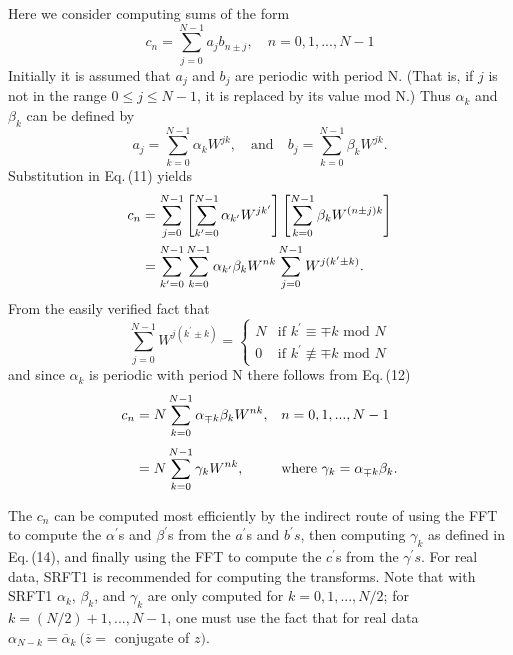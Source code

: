 \documentclass[twoside]{MATH77}
\begin{document}
Here we consider computing sums of the form
\begin{equation}\label{O11}
c_n=\sum_{j=0}^{N-1}a_jb_{n\pm j},\quad n=0,1,...,N-1
\end{equation}
Initially it is assumed that $a_j$ and $b_j$ are periodic with period N.
(That is, if $j$ is not in the range $0\leq j\leq {N-1}$, it is replaced by
its value mod N.) Thus $\alpha _k$ and $\beta _k$ can be defined by%
\begin{equation*}
a_j=\sum_{k=0}^{N-1}\alpha _kW^{jk},\quad \text{and}\quad
b_j=\sum_{k=0}^{N-1}\beta _kW^{jk}.
\end{equation*}
Substitution in Eq.\,(11) yields
\begin{equation}\label{O12}
\begin{split}
 c_n&=\sum_{j=0}^{N-1}\left[ \sum_{k^{\prime }=0}^{N-1}\alpha
_{k^{\prime }}W^{jk^{\prime }}\right] \left[ \sum_{k=0}^{N-1}\beta
_kW^{(n\pm j)k}\right] \vspace{4pt} \\ \displaystyle\phantom{c_n}%
&=\sum_{k^{\prime }=0}^{N-1}\sum_{k=0}^{N-1}\alpha _{k^{\prime }}\beta
_kW^{nk}\sum_{j=0}^{N-1}W^{j(k^{\prime }\pm k)}.
\end{split}
\end{equation}
From the easily verified fact that
\begin{equation}\label{O13}
\sum_{j=0}^{N-1}W^{j(k^{\prime }\pm k)}=
\begin{cases}
N & \text{if }k^{\prime }\equiv \mp k\text{ mod }N \\
0 & \text{if }k^{\prime }\not \equiv \mp k\text{ mod }N
\end{cases}
\end{equation}
and since $\alpha _k$ is periodic with period N there follows from Eq.\,(12)
\begin{equation}\label{O14}
\begin{array}{ll}
\displaystyle c_n=N\sum_{k=0}^{N-1}\alpha _{\mp k}\beta _kW^{nk},&%
n=0,1,...,N-1\rule[-20pt]{0pt}{20pt}\\
\displaystyle \phantom{c_n}=N\sum_{k=0}^{N-1}\gamma _kW^{nk},&%
\text{where }\gamma _k=\alpha _{\mp k}\beta _k.
\end{array}
\end{equation}

The $c_n$ can be computed most efficiently by the indirect route of
using the FFT to compute the $\alpha ^{\prime }$s and $\beta ^{\prime
}$s from the $a^{\prime }$s and $b^{\prime }s$, then computing
$\gamma _k$ as defined in Eq.\,(14), and finally using the FFT to
compute the $c^{\prime }$s from the $\gamma ^{\prime }s$. For real
data, SRFT1 is recommended for computing the transforms. Note that
with SRFT1 $\alpha _k$, $\beta _k$, and $\gamma _k$ are only computed
for $k=0,1,...,N/2$; for $k=(N/2)+1,...,N-1$, one must use the fact
that for real data $\alpha _{N-k}=\overline{\alpha }_k\
(\overline{z}=$ conjugate of $z).$
\end{document}
